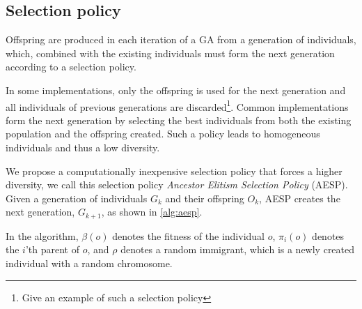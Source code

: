 \subsection{Selection policy}
Offspring are produced in each iteration of a GA from a generation of individuals, which, combined with the existing individuals must form the next generation according to a selection policy.

In some implementations, only the offspring is used for the next generation and all individuals of previous generations are discarded\footnote{ Give an example of such a selection policy}. Common implementations form the next generation by selecting the best individuals from both the existing population and the offspring created\cite{masterThesisGANN}. Such a policy leads to homogeneous individuals and thus a low diversity.

We propose a computationally inexpensive selection policy that forces a higher diversity, we call this selection policy \emph{Ancestor Elitism Selection Policy} (AESP). Given a generation of individuals $G_k$ and their offspring $O_k$, AESP creates the next generation, $G_{k+1}$, as shown in \cref{alg:aesp}.
%

%
In the algorithm, $\beta(o)$ denotes the fitness of the individual $o$, $\pi_i(o)$ denotes the $i$'th parent of $o$, and $\rho$ denotes a random immigrant, which is a newly created individual with a random chromosome.

